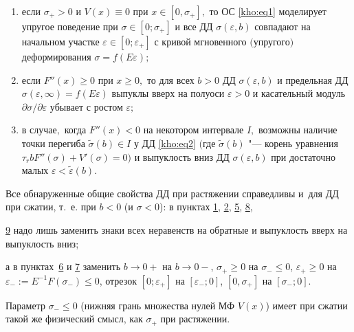 \begin{theorem}[1]
\begin{enumerate}
\hypertarget{kh:p7}{} 

\item[\rm 7)]  если $\sigma_{+}>0$ и $V(x)\equiv0$ при $x\in[0,\sigma_{+}],$ то ОС \eqref{kho:eq1} моделирует упругое поведение при $\sigma\in[0;\sigma_{+}]$ и все ДД $\sigma(\varepsilon,b)$ совпадают на начальном участке $\varepsilon\in[0;\varepsilon_{+}]$ с кривой мгновенного $($упругого$)$ деформирования $\sigma=f(E\varepsilon);$





\hypertarget{kh:p8}{} 

\item[\rm 8)] если $F''(x)\ge0$ при $x\ge0,$ то для всех $b>0$ ДД $\sigma(\varepsilon,b)$ и предельная ДД $\sigma(\varepsilon,\infty)=f(E\varepsilon)$ выпуклы вверх на полуоси $\varepsilon>0$ и касательный модуль $\partial\sigma/\partial\varepsilon$ убывает с ростом $\varepsilon;$



\hypertarget{kh:p9}{} 

\item[\rm 9)]  в случае$,$ когда $F''(x)<0$ на некотором интервале $I,$ возможны наличие точки перегиба $\tilde{\sigma}(b)\in I$ у ДД \eqref{kho:eq2} $($где $\tilde{\sigma}(b)$ "--- корень уравнения $\tau_r bF''(\sigma)+V'(\sigma)=0)$ и выпуклость вниз ДД $\sigma(\varepsilon,b)$ при достаточно малых $\varepsilon<\tilde{\varepsilon}(b).$ 

\end{enumerate}

\end{theorem}



\smallskip



Все обнаруженные общие свойства ДД при растяжении справедливы и~для ДД при сжатии, т.~е. при $b<0$ (и $\sigma<0$): в пунктах \hyperlink{kh:p1}{1}, \hyperlink{kh:p2}{2}, \hyperlink{kh:p5}{5}, \hyperlink{kh:p8}{8}, 

\hyperlink{kh:p9}{9} надо лишь заменить знаки всех неравенств на обратные и выпуклость вверх на выпуклость вниз; 

а в пунктах~\hyperlink{kh:p6}{6} и \hyperlink{kh:p7}{7} заменить $b\to0+$ на $b\to0-$, $\sigma_{+}\ge0$ на $\sigma_{-}\le0$, $\varepsilon_{+}\ge0$ на $\varepsilon_{-}:=E^{-1}F(\sigma_{-})\le0$, отрезок $[0;\varepsilon_{+}]$ на $[\varepsilon_{-};0]$, $[0,\sigma_{+}]$ на $[\sigma_{-};0]$. 

Параметр $\sigma_{-}\le0$ (нижняя грань множества нулей МФ $V(x)$) имеет при сжатии такой же физический смысл, как $\sigma_{+}$ при растяжении.



